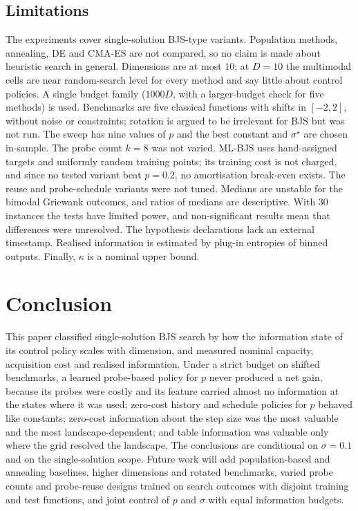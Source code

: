 \documentclass[conference]{IEEEtran}
\begin{document}
\subsection{Limitations}\label{sec:limits}
The experiments cover single-solution BJS-type variants. Population methods, annealing, DE and CMA-ES are not compared, so no claim is made about heuristic search in general. Dimensions are at most $10$; at $D=10$ the multimodal cells are near random-search level for every method and say little about control policies. A single budget family ($1000D$, with a larger-budget check for five methods) is used. Benchmarks are five classical functions with shifts in $[-2,2]$, without noise or constraints; rotation is argued to be irrelevant for BJS but was not run. The sweep has nine values of $p$ and the best constant and $\sigma^\star$ are chosen in-sample. The probe count $k=8$ was not varied. ML-BJS uses hand-assigned targets and uniformly random training points; its training cost is not charged, and since no tested variant beat $p=0.2$, no amortisation break-even exists. The reuse and probe-schedule variants were not tuned. Medians are unstable for the bimodal Griewank outcomes, and ratios of medians are descriptive. With 30 instances the tests have limited power, and non-significant results mean that differences were unresolved. The hypothesis declarations lack an external timestamp. Realised information is estimated by plug-in entropies of binned outputs. Finally, $\kappa$ is a nominal upper bound.

\section{Conclusion}
This paper classified single-solution BJS search by how the information state of its control policy scales with dimension, and measured nominal capacity, acquisition cost and realised information. Under a strict budget on shifted benchmarks, a learned probe-based policy for $p$ never produced a net gain, because its probes were costly and its feature carried almost no information at the states where it was used; zero-cost history and schedule policies for $p$ behaved like constants; zero-cost information about the step size was the most valuable and the most landscape-dependent; and table information was valuable only where the grid resolved the landscape. The conclusions are conditional on $\sigma=0.1$ and on the single-solution scope. Future work will add population-based and annealing baselines, higher dimensions and rotated benchmarks, varied probe counts and probe-reuse designs trained on search outcomes with disjoint training and test functions, and joint control of $p$ and $\sigma$ with equal information budgets.
\end{document}
